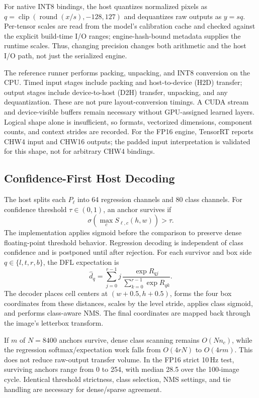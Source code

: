 For native INT8 bindings, the host quantizes normalized pixels as
$q=\operatorname{clip}(\operatorname{round}(x/s),-128,127)$ and dequantizes
raw outputs as $y=sq$. Per-tensor scales are read from the model's calibration
cache and checked against the explicit build-time I/O ranges; engine-hash-bound
metadata supplies the runtime scales. Thus, changing precision changes both
arithmetic and the host I/O path, not just the serialized engine.

The reference runner performs packing, unpacking, and INT8 conversion on the
CPU. Timed input stages include packing and host-to-device (H2D) transfer;
output stages include device-to-host (D2H) transfer, unpacking, and any
dequantization. These are not pure layout-conversion timings. A CUDA stream
and device-visible buffers remain necessary without GPU-assigned learned layers.
Logical shape alone is insufficient, so formats, vectorized dimensions,
component counts, and context strides are recorded. For the FP16 engine,
TensorRT reports CHW4 input and CHW16 outputs; the padded input interpretation
is validated for this shape, not for arbitrary CHW4 bindings.

\subsection{Confidence-First Host Decoding}
\label{sec:decode}
The host splits each $P_\ell$ into 64 regression channels and 80 class channels.
For confidence threshold $\tau\in(0,1)$, an anchor survives if
\begin{equation}
 \sigma\!\left(\max_c S_{\ell,c}(h,w)\right) > \tau.
 \label{eq:threshold}
\end{equation}
The implementation applies sigmoid before the comparison to preserve dense
floating-point threshold behavior. Regression decoding is independent of
class confidence and is postponed until after rejection. For each
survivor and box side $q\in\{l,t,r,b\}$, the DFL expectation is
\begin{equation}
 \hat d_q=\sum_{j=0}^{r-1}j\,
 \frac{\exp R_{qj}}{\sum_{k=0}^{r-1}\exp R_{qk}}.
 \label{eq:dfl}
\end{equation}
The decoder places cell centers at $(w+0.5,h+0.5)$, forms the four box
coordinates from these distances, scales by the level stride, applies class
sigmoid, and performs class-aware NMS. The final coordinates are mapped back
through the image's letterbox transform.

If $m$ of $N=8400$ anchors survive, dense class scanning remains
$O(Nn_c)$, while the regression softmax/expectation work falls from $O(4rN)$
to $O(4rm)$. This does not reduce raw-output transfer volume. In the FP16 strict
10\,Hz test, surviving anchors range from 0 to 254, with median 28.5 over the
100-image cycle. Identical threshold strictness, class selection, NMS settings,
and tie handling are necessary for dense/sparse agreement.
